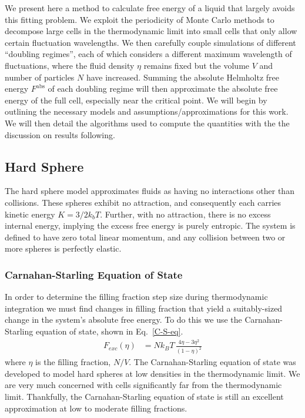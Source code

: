 \documentclass[12pt]{article}
\begin{document}
We present here a method to calculate free energy of a liquid that largely avoids this fitting problem. We exploit the periodicity of Monte Carlo methods to decompose large cells in the thermodynamic limit into small cells that only allow certain fluctuation wavelengths. We then carefully couple simulations of different ``doubling regimes'', each of which considers a different maximum wavelength of fluctuations, where the fluid density $\eta$ remains fixed but the volume $V$ and number of particles $N$ have increased. Summing the absolute Helmholtz free energy $F^{\text{abs}}$ of each doubling regime will then approximate the absolute free energy of the full cell, especially near the critical point. We will begin by outlining the necessary models and assumptions/approximations for this work. We will then detail the algorithms used to compute the quantities with the the discussion on results following. 

\subsection{Hard Sphere}
The hard sphere model approximates fluids as having no interactions other than collisions. These spheres exhibit no attraction, and consequently each carries kinetic energy $K = 3/2 k_b T$. Further, with no attraction, there is no excess internal energy, implying the excess free energy is purely entropic. The system is defined to have zero total linear momentum, and any collision between two or more spheres is perfectly elastic. 

\subsubsection{Carnahan-Starling Equation of State}
In order to determine the filling fraction step size during thermodynamic integration we must find changes in filling fraction that yield a suitably-sized change in the system's absolute free energy. To do this we use the Carnahan-Starling equation of state, shown in Eq.~\ref{C-S-eq}.
\begin{align}
    F_{exc}(\eta) &= N k_B T\,\frac{4\eta - 3\eta^2}{(1-\eta)^2}   
    \label{C-S-eq}  
\end{align} 
where $\eta$ is the filling fraction, $N/V$. The Carnahan-Starling equation of state was developed to model hard spheres at low densities in the thermodynamic limit. We are very much concerned with cells significantly far from the thermodynamic limit. Thankfully, the Carnahan-Starling equation of state is still an excellent approximation at low to moderate filling fractions.\\ 
\end{document}
